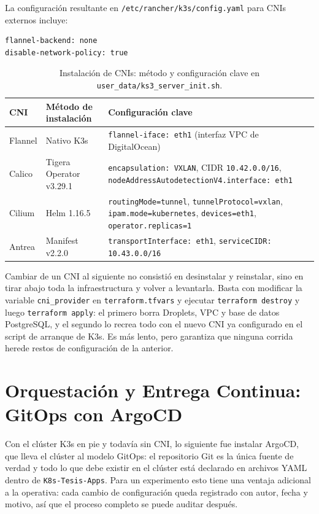 La configuración resultante en \texttt{/etc/rancher/k3s/config.yaml} para CNIs externos incluye:
\begin{lstlisting}
flannel-backend: none
disable-network-policy: true
\end{lstlisting}

\begin{table}[htbp]
\centering
\scriptsize
\renewcommand{\arraystretch}{1.25}
\setlength{\tabcolsep}{4pt}
\caption{Instalación de CNIs: método y configuración clave en \texttt{user\_data/ks3\_server\_init.sh}.}
\label{tab:cni-instalacion}
\begin{tabularx}{\textwidth}{|l|p{3.2cm}|Y|}
\hline
\textbf{CNI} & \textbf{Método de instalación} & \textbf{Configuración clave} \\
\hline
Flannel & Nativo K3s & \texttt{flannel-iface: eth1} (interfaz VPC de DigitalOcean) \\
\hline
Calico & Tigera Operator v3.29.1 & \texttt{encapsulation: VXLAN}, CIDR \texttt{10.42.0.0/16}, \texttt{nodeAddressAutodetectionV4.interface: eth1} \\
\hline
Cilium & Helm 1.16.5 & \texttt{routingMode=tunnel}, \texttt{tunnelProtocol=vxlan}, \texttt{ipam.mode=kubernetes}, \texttt{devices=eth1}, \texttt{operator.replicas=1} \\
\hline
Antrea & Manifest v2.2.0 & \texttt{transportInterface: eth1}, \texttt{serviceCIDR: 10.43.0.0/16} \\
\hline
\end{tabularx}
\end{table}

Cambiar de un CNI al siguiente no consistió en desinstalar y reinstalar, sino en tirar abajo toda la infraestructura y volver a levantarla. Basta con modificar la variable \texttt{cni\_provider} en \texttt{terraform.tfvars} y ejecutar \texttt{terraform destroy} y luego \texttt{terraform apply}: el primero borra Droplets, VPC y base de datos PostgreSQL, y el segundo lo recrea todo con el nuevo CNI ya configurado en el script de arranque de K3s. Es más lento, pero garantiza que ninguna corrida herede restos de configuración de la anterior.

\section{Orquestación y Entrega Continua: GitOps con ArgoCD}

Con el clúster K3s en pie y todavía sin CNI, lo siguiente fue instalar ArgoCD, que lleva el clúster al modelo GitOps: el repositorio Git es la única fuente de verdad y todo lo que debe existir en el clúster está declarado en archivos YAML dentro de \texttt{K8s-Tesis-Apps}. Para un experimento esto tiene una ventaja adicional a la operativa: cada cambio de configuración queda registrado con autor, fecha y motivo, así que el proceso completo se puede auditar después.


